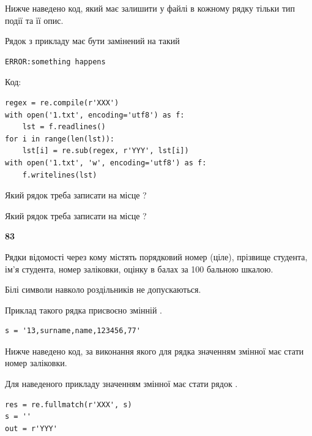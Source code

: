 Нижче наведено код, який має залишити у файлі в кожному рядку тільки тип події та її опис.

Рядок з прикладу має бути замінений на такий



\begin{verbatim}
ERROR:something happens
\end{verbatim}




Код:



\begin{verbatim}
regex = re.compile(r'XXX')
with open('1.txt', encoding='utf8') as f:
    lst = f.readlines()
for i in range(len(lst)):
    lst[i] = re.sub(regex, r'YYY', lst[i])
with open('1.txt', 'w', encoding='utf8') as f:
    f.writelines(lst)
\end{verbatim}









Який рядок треба записати на місце  ?\par
\vspace{5mm}


Який рядок треба записати на місце  ?\par


\newpage

{\begin {center}\textbf{ 83}\end {center}}\par
Рядки відомості через кому містять порядковий номер (ціле), пріз\-ви\-ще студен\-та, ім'я студента, номер заліковки, оцінку в балах за 100 бальною шкалою.

Білі символи навколо роздільників не допускаються.

Приклад такого рядка присвоєно змінній .



\begin{verbatim}
s = '13,surname,name,123456,77'
\end{verbatim}


Нижче наведено код, за виконання якого для рядка  значенням змінної  має стати номер заліковки.

Для наведеного прикладу значенням змінної  має стати рядок  .



\begin{verbatim}
res = re.fullmatch(r'XXX', s)
s = ''
out = r'YYY'
\end{verbatim}


